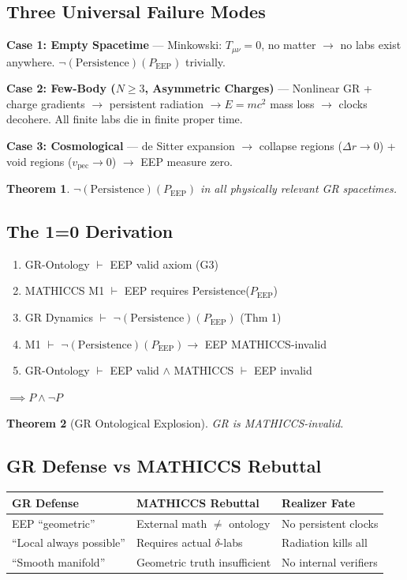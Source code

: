 \documentclass[11pt,a4paper]{article}
\newtheorem{theorem}{Theorem}
\begin{document}
\subsection{Three Universal Failure Modes}
\textbf{Case 1: Empty Spacetime} --- Minkowski: $T_{\mu\nu}=0$, no matter $\to$ no labs exist anywhere. $\neg(\text{Persistence})(P_{\text{EEP}})$ trivially.

\textbf{Case 2: Few-Body ($N\ge 3$, Asymmetric Charges)} --- Nonlinear GR + charge gradients $\to$ persistent radiation $\to E=mc^2$ mass loss $\to$ clocks decohere. All finite labs die in finite proper time.

\textbf{Case 3: Cosmological} --- de Sitter expansion $\to$ collapse regions ($\Delta r\to 0$) + void regions ($v_{\text{pec}}\to 0$) $\to$ EEP measure zero.

\begin{theorem}
$\neg(\text{Persistence})(P_{\text{EEP}})$ in all physically relevant GR spacetimes.
\end{theorem}

\subsection{The 1=0 Derivation}
\begin{enumerate}
\item GR-Ontology $\vdash$ EEP valid axiom (G3)
\item MATHICCS M1 $\vdash$ EEP requires Persistence($P_{\text{EEP}}$)
\item GR Dynamics $\vdash$ $\neg(\text{Persistence})(P_{\text{EEP}})$ (Thm 1)
\item M1 $\vdash$ $\neg(\text{Persistence})(P_{\text{EEP}})\to$ EEP MATHICCS-invalid
\item GR-Ontology $\vdash$ EEP valid $\land$ MATHICCS $\vdash$ EEP invalid
\end{enumerate}
$\implies P \land \neg P$

\begin{theorem}[GR Ontological Explosion]
GR is MATHICCS-invalid.
\end{theorem}

\subsection{GR Defense vs MATHICCS Rebuttal}
\begin{tabular}{lll}
\toprule
\textbf{GR Defense} & \textbf{MATHICCS Rebuttal} & \textbf{Realizer Fate} \\
\midrule
EEP ``geometric'' & External math $\neq$ ontology & No persistent clocks \\
``Local always possible'' & Requires actual $\delta$-labs & Radiation kills all \\
``Smooth manifold'' & Geometric truth insufficient & No internal verifiers \\
\bottomrule
\end{tabular}
\end{document}
